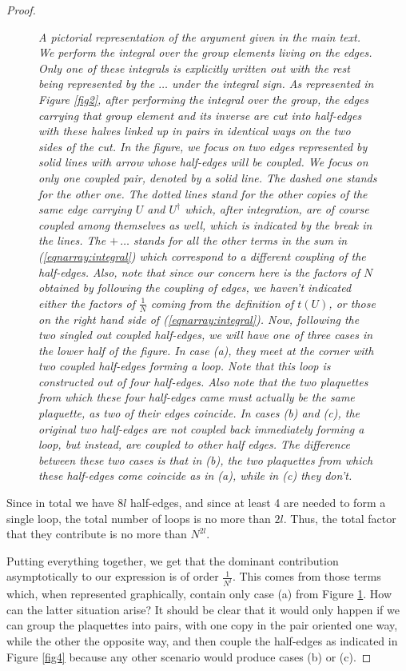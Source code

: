 \documentclass[twoside, a4paper,10pt]{article}
\begin{document}
\begin{proof}
\begin{figure}[h]
\caption{\textit{A pictorial representation of the argument given in the main text. We perform the integral over the group elements living on the edges. Only one of these integrals is explicitly written out with the rest being represented by the $\dots$ under the integral sign. As represented in Figure \ref{fig2}, after performing the integral over the group, the edges carrying that group element and its inverse are cut into half-edges with these halves linked up in pairs in identical ways on the two sides of the cut. In the figure, we focus on two edges represented by solid lines with arrow whose half-edges will be coupled. We focus on only one coupled pair, denoted by a solid line. The dashed one stands for the other one. The dotted lines stand for the other copies of the same edge carrying $U$ and $U^\dagger$ which, after integration, are of course coupled among themselves as well, which is indicated by the break in the lines. The $+ \, \dots$ stands for all the other terms in the sum in (\ref{eqnarray:integral}) which correspond to a different coupling of the half-edges. Also, note that since our concern here is the factors of $N$ obtained by following the coupling of edges, we haven't indicated either the factors of $\frac{1}{N}$ coming from the definition of $t(U)$, or those on the right hand side of (\ref{eqnarray:integral}). Now, following the two singled out coupled half-edges, we will have one of three cases in the lower half of the figure. In case (a), they meet at the corner with two coupled half-edges forming a loop. Note that  this loop is constructed out of four half-edges. Also note that the two plaquettes from which these four half-edges came must actually be the same plaquette, as two of their edges coincide. In cases (b) and (c), the original two half-edges are not coupled back immediately forming a loop, but instead, are coupled to other half edges. The difference between these two cases is that in (b), the two plaquettes from which these half-edges come coincide as in (a), while in (c) they don't. } }
\label{fig3}
\end{figure}




Since in total we have $8l$ half-edges, and since at least 4 are needed to form a single loop, the total number of loops is no more than $2l$. Thus, the total factor that they contribute is no more than $N^{2l}$. \newline

Putting everything together, we get that the dominant contribution asymptotically to our expression is of order $\frac{1}{N^l}$. This comes from those terms which, when represented graphically, contain only case (a) from Figure \ref{fig3}. How can the latter situation arise? It should be clear that it would only happen if we can group the plaquettes into pairs, with one copy in the pair oriented one way, while the other the opposite way, and then couple the half-edges as indicated in Figure \ref{fig4} because any other scenario would produce cases (b) or (c). \newline



\end{proof}
\end{document}
